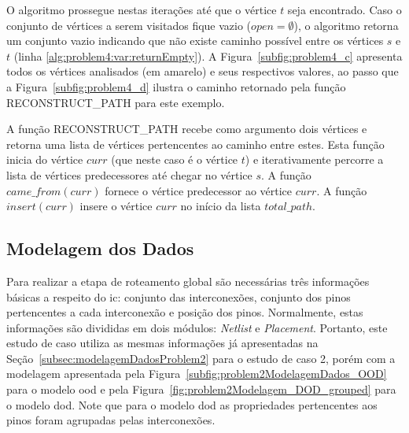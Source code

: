 O algoritmo prossegue nestas iterações até que o vértice $t$ seja encontrado. Caso o conjunto de vértices a serem visitados fique vazio ($open = \emptyset$), o algoritmo retorna um conjunto vazio indicando que não existe caminho possível entre os vértices $s$ e $t$ (linha \ref{alg:problem4:var:returnEmpty}).
A Figura~\ref{subfig:problem4_c} apresenta todos os vértices analisados (em amarelo) e seus respectivos valores, ao passo que a Figura~\ref{subfig:problem4_d} ilustra o caminho retornado pela função  RECONSTRUCT\_PATH para este exemplo.

A função RECONSTRUCT\_PATH recebe como argumento dois vértices e retorna uma lista de vértices pertencentes ao caminho entre estes.
Esta função inicia do vértice $curr$ (que neste caso é o vértice $t$) e iterativamente percorre a lista de vértices predecessores até chegar no vértice $s$.
A função $came\_from(curr)$ fornece o vértice predecessor ao vértice $curr$.
A função $insert(curr)$ insere o vértice $curr$ no início da lista $total\_path$.


\subsection{Modelagem dos Dados}

Para realizar a etapa de roteamento global são necessárias três informações básicas a respeito do \ac{ic}: conjunto das interconexões, conjunto dos pinos pertencentes a cada interconexão e posição dos pinos.
Normalmente, estas informações são divididas em dois módulos: \textit{Netlist} e \textit{Placement}.
Portanto, este estudo de caso utiliza as mesmas informações já apresentadas na Seção~\ref{subsec:modelagemDadosProblem2} para o estudo de caso 2, porém com a modelagem apresentada pela Figura~\ref{subfig:problem2ModelagemDados_OOD} para o modelo \ac{ood} e pela Figura~\ref{fig:problem2Modelagem_DOD_grouped} para o modelo \ac{dod}.
Note que para o modelo \ac{dod} as propriedades pertencentes aos pinos foram agrupadas pelas interconexões.

